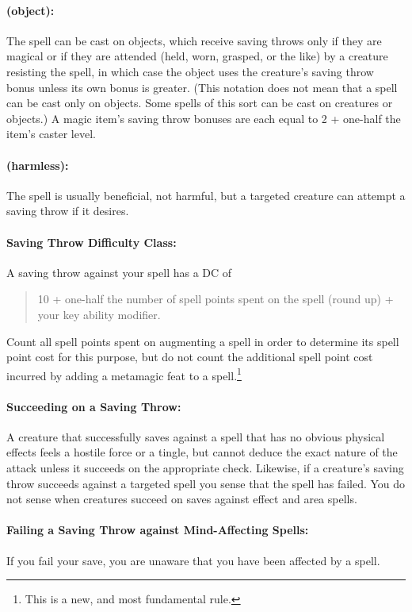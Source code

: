 \documentclass[../VancianToPsionics.tex]{subfiles}
\begin{document}
\paragraph{(object):} The spell can be cast on objects, which receive saving throws only if they are magical or if they are attended (held, worn, grasped, or the like) by a creature resisting the spell, in which case the object uses the creature's saving throw bonus unless its own bonus is greater. (This notation does not mean that a spell can be cast only on objects. Some spells of this sort can be cast on creatures or objects.) A magic item's saving throw bonuses are each equal to 2 + one-half the item's caster level.

\paragraph{(harmless):} The spell is usually beneficial, not harmful, but a targeted creature can attempt a saving throw if it desires.

\paragraph{Saving Throw Difficulty Class:} 

A saving throw against your spell has a DC of
\begin{quote}
\centering
\large 
 {10 + one-half the number of spell points spent on the spell (round up) + your key ability modifier.}
\end{quote}
Count all spell points spent on augmenting a spell in order to determine its spell point cost for this purpose, 
but do not count the additional spell point cost incurred by adding a metamagic feat to a spell.\footnote{This is a new, and most fundamental rule.}

\paragraph{Succeeding on a Saving Throw:} A creature that successfully saves against a spell that has no obvious physical effects feels a hostile force or a tingle, but cannot deduce the exact nature of the attack unless it succeeds on the appropriate  check. 
Likewise, if a creature's saving throw succeeds against a targeted spell you sense that the spell has failed. 
You do not sense when creatures succeed on saves against effect and area spells.

\paragraph{Failing a Saving Throw against Mind-Affecting Spells:} If you fail your save, you are unaware that you have been affected by a spell.
\end{document}
